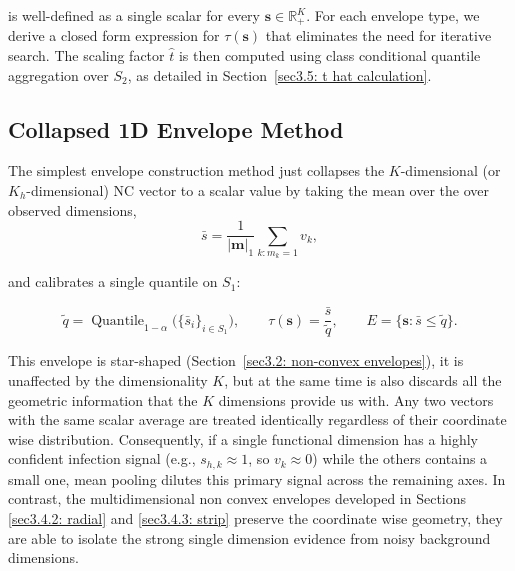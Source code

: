 is well-defined as a single scalar for every $\mathbf{s} \in \mathbb{R}^K_+$. For each envelope type, we derive a 
closed form expression for $\tau(\mathbf{s})$ that eliminates the need for iterative search. The scaling factor $\hat{t}$ is 
then computed using class conditional quantile aggregation over $S_2$, as detailed in Section~\ref{sec3.5: t hat calculation}.


\subsection{Collapsed 1D Envelope Method}
\label{sec3.4.1: collapsed 1d}
The simplest envelope construction method just collapses the $K$-dimensional (or $K_h$-dimensional) NC vector to a 
scalar value by taking the mean over the over observed dimensions,
\begin{equation*}
\bar{s} = \frac{1}{|\mathbf{m}|_1} \sum_{k : m_k = 1} v_k,
\end{equation*}

and calibrates a single quantile on $S_1$:

\begin{equation*}
\tilde{q} = \operatorname{Quantile}_{1-\alpha}\big(\{\bar{s}_i\}_{i \in S_1}\big), \qquad 
\tau(\mathbf{s}) = \frac{\bar{s}}{\tilde{q}}, \qquad E = \{\mathbf{s} : \bar{s} \le \tilde{q}\}.
\end{equation*}

This envelope is star-shaped (Section~\ref{sec3.2: non-convex envelopes}), it is unaffected by the dimensionality 
$K$, but at the same time is also discards all the geometric information that the $K$ dimensions provide us with. 
Any two vectors with the same scalar average are treated identically regardless of their coordinate wise distribution. 
Consequently, if a single functional dimension has a highly confident infection signal (e.g., $s_{h,k} \approx 1$, so 
$v_k \approx 0$) while the others contains a small one, mean pooling dilutes this primary signal across 
the remaining axes. In contrast, the multidimensional non convex envelopes developed in Sections \ref{sec3.4.2: radial} 
and \ref{sec3.4.3: strip} preserve the coordinate wise geometry, they are able to isolate the strong single dimension 
evidence from noisy background dimensions.



